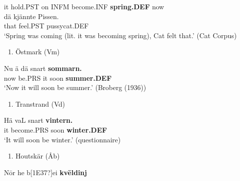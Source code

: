 it  hold.PST  on  INFM  become.INF  \textbf{spring.DEF} now\\ %


\ea\label{}
\gll dä  kjännte  Pissen.\\


that  feel.PST  pussycat.DEF\\ %


‘Spring was coming (lit. it was becoming spring), Cat felt that.’ (Cat Corpus)
\z


\begin{enumerate} %
\item 
Östmark (Vm)

\end{enumerate} %
\ea\label{}
\gll Nu  ä  dä  snart  \textbf{sommarn.}\\


now  be.PRS  it  soon  \textbf{summer.DEF}\\ %


‘Now it will soon be summer.’ (Broberg (1936))
\z

\begin{enumerate} %
\item 
Transtrand (Vd) 

\end{enumerate} %
\ea\label{}
\gll Hä  vaL  snart  \textbf{vintern.}\\


it  become.PRS  soon  \textbf{winter.DEF}\\ %


‘It will soon be winter.’ (questionnaire)
\z


\begin{enumerate} %
\item 
Houtskär (Åb)

\end{enumerate} %
\ea\label{}
\gll N\=or  he  b[1E37?]ei  \textbf{kv}\textbf{\=e}\textbf{ldinj}\\


